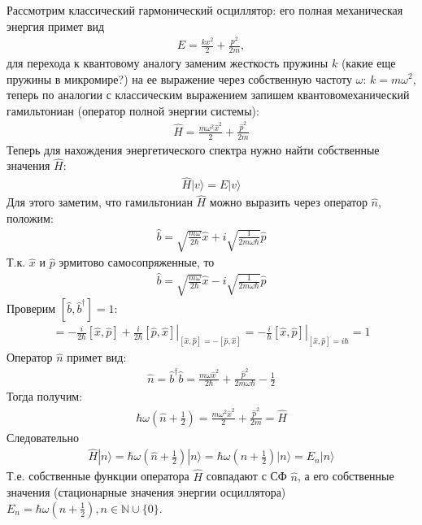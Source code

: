 Рассмотрим классический гармонический осциллятор: его полная механическая энергия примет вид
\begin{gather*}
E = \frac{kx^2}{2}+\frac{p^2}{2m},
\end{gather*}
для перехода к квантовому аналогу заменим жесткость пружины $k$ (какие еще пружины в микромире?) на ее выражение через собственную частоту $\omega$: $k=m\omega^2$, теперь по аналогии с классическим выражением запишем квантовомеханический гамильтониан (оператор полной энергии системы):
\begin{gather*}
\hat{H} = \frac{m\omega^2\hat{x}^2}{2}+\frac{\hat{p}^2}{2m}
\end{gather*}
Теперь для нахождения энергетического спектра нужно найти собственные значения $\hat{H}$:
\begin{gather*}
\hat{H}|v\rangle = E|v\rangle
\end{gather*}
Для этого заметим, что гамильтониан $\hat{H}$ можно выразить через оператор $\hat{n}$, положим:
\begin{gather*}
\hat{b} = \sqrt{\frac{m\omega}{2\hbar}}\hat{x} + i\sqrt{\frac{1}{2m\omega\hbar}}\hat{p}
\end{gather*}
Т.к. $\hat{x}$ и $\hat{p}$ эрмитово самосопряженные, то
\begin{gather*}
\hat{b} = \sqrt{\frac{m\omega}{2\hbar}}\hat{x} - i\sqrt{\frac{1}{2m\omega\hbar}}\hat{p}
\end{gather*}
Проверим $[\hat{b},\hat{b}^\dagger]=1$:
\begin{gather*}
[\hat{b},\hat{b}^\dagger]
=
\left.
-\frac{i}{2\hbar}[\hat{x},\hat{p}]+\frac{i}{2\hbar}[\hat{p},\hat{x}]
\right|_{[\hat{x},\hat{p}]=-[\hat{p},\hat{x}]}
=
\left.
-\frac{i}{\hbar}[\hat{x},\hat{p}]
\right|_{[\hat{x},\hat{p}]=i\hbar}
=
1
\end{gather*}
Оператор $\hat{n}$ примет вид:
\begin{gather*}
\hat{n}=\hat{b}^\dagger\hat{b}=\frac{m\omega\hat{x}^2}{2\hbar}+\frac{\hat{p}^2}{2m\omega\hbar}-\frac{1}{2}
\end{gather*}
Тогда получим:
\begin{gather*}
\hbar\omega\left(\hat{n}+\frac{1}{2}\right)
=
\frac{m\omega^2\hat{x}^2}{2}+\frac{\hat{p}^2}{2m}
=
\hat{H}
\end{gather*}
Следовательно
\begin{gather*}
\hat{H}|n\rangle
=
\hbar\omega\left(\hat{n}+\frac{1}{2}\right)|n\rangle
=
\hbar\omega\left(n+\frac{1}{2}\right)|n\rangle
=
E_n|n\rangle
\end{gather*}
Т.е. собственные функции оператора $\hat{H}$ совпадают с СФ $\hat{n}$, а его собственные значения (стационарные значения энергии осциллятора) $E_n=\hbar\omega\left(n+\frac{1}{2}\right),n\in\mathbb{N}\cup\{0\}$.

